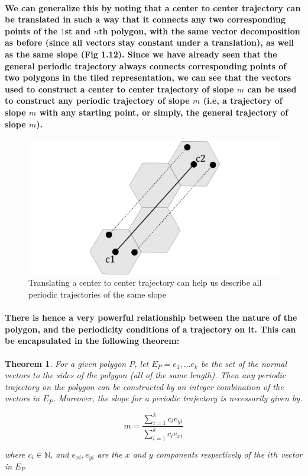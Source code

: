 \documentclass{report}
\newtheorem{theorem}{Theorem}[chapter]
\begin{document}
\paragraph{We can generalize this by noting that a center to center trajectory can be translated in such a way that it connects any two corresponding points of the $1$st and $n$th polygon, with the same vector decomposition as before (since all vectors stay constant under a translation), as well as the same slope (Fig 1.12). Since we have already seen that the general periodic trajectory always connects corresponding points of two polygons in the tiled representation, we can see that the vectors used to construct a center to center trajectory of slope $m$ can be used to construct any periodic trajectory of slope $m$ (i.e, a trajectory of slope $m$ with any starting point, or simply, the general trajectory of slope $m$).}



\begin{figure}
\begin{center}
\includegraphics[scale=0.3]{12}
\caption{Translating a center to center trajectory can help us describe all periodic trajectories of the same slope}
\end{center}
\end{figure}


\paragraph{There is hence a very powerful relationship between the nature of the polygon, and the periodicity conditions of a trajectory on it. This can be encapsulated in the following theorem:}

\pagebreak

\begin{theorem}
For a given polygon $P$, let $E_P = {e_1,...e_k}$ be the set of the normal vectors to the sides of the polygon (all of the same length). Then any periodic trajectory on the polygon can be constructed by an integer combination of the vectors in $E_P$. Moreover, the slope for a periodic trajectory is necessarily given by.

\begin{equation}
m=\frac{\sum_{i=1}^k  c_ie_{yi} }{\sum_{i=1}^k  c_ie_{xi} }  
\end{equation}

where $c_i \in \mathbb{N}$, and $e_{xi}, e_{yi}$ are the $x$ and $y$ components respectively of the $ith$ vector in $E_P$
\end{theorem}
\end{document}
